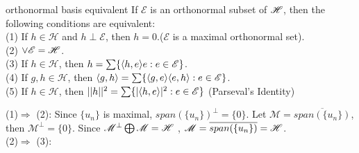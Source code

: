 \begin{theorem}{}{orthonormal basis equivalent}
    If $\mathscr{E}$ is an orthonormal subset of $\mathscr{H}$, then the following conditions are equivalent:\\
    (1) If $h\in\mathscr{H}$ and $h\perp \mathscr{E}$, then $h=0$.($\mathscr{E}$ is a maximal orthonormal set).\\
    (2) $\vee \mathscr{E}=\mathscr{H}$. \\
    (3) If $h\in\mathscr{H}$, then $h=\sum \{\langle h,e\rangle e:e\in\mathscr{E}\}$.\\
    (4) If $g,h\in\mathscr{H}$, then
        $\langle g,h\rangle=\sum \{\langle g,e\rangle\langle e,h\rangle:e\in\mathscr{E}\}$.\\
    (5) If $h\in\mathscr{H}$, then $||h||^2=\sum \{|\langle h,e\rangle|^2:e\in\mathscr{E}\}$ (Parseval's Identity)
\end{theorem}
\begin{proofsolution}
    (1)$\Rightarrow$ (2): Since $\{u_n\}$ is maximal, $span(\{u_n\})^{\perp} = \{0\}$. 
    Let $\mathscr{M} = \overline{span(\{u_n\})}$, then $\mathscr{M}^{\perp}=\{0\}$. Since $\mathscr{M}^{\perp}\bigoplus \mathscr{M} = \mathscr{H}$ , $\mathscr{M} = \overline{span(\{u_n\})}=\mathscr{H}$.
    \\
    (2)$\Rightarrow$ (3): 
\end{proofsolution}


